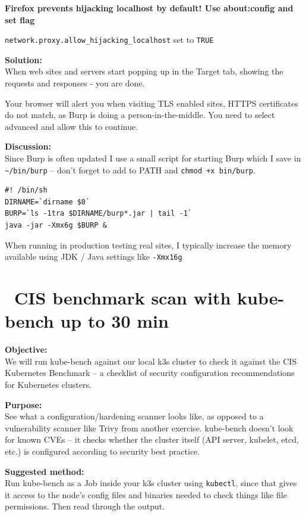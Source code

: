 \documentclass[a4paper,11pt,notitlepage]{report}
\begin{document}
\textbf{Firefox prevents hijacking localhost by default! Use about:config and set flag}

\verb+network.proxy.allow_hijacking_localhost+ set to \verb+TRUE+





{\bf Solution:}\\
When web sites and servers start popping up in the Target tab, showing the requests and responses - you are done.

Your browser will alert you when visiting TLS enabled sites, HTTPS certificates do not match, as Burp is doing a person-in-the-middle. You need to select advanced and allow this to continue.

{\bf Discussion:}\\
Since Burp is often updated I use a small script for starting Burp which I save in \verb+~/bin/burp+ -- don't forget to add to PATH and \verb;chmod +x bin/burp;.

\begin{verbatim}
#! /bin/sh
DIRNAME=`dirname $0`
BURP=`ls -1tra $DIRNAME/burp*.jar | tail -1`
java -jar -Xmx6g $BURP &
\end{verbatim}

When running in production testing real sites, I typically increase the memory available using JDK / Java settings like \verb+-Xmx16g+




\chapter{\faInfoCircle\ CIS benchmark scan with kube-bench up to 30 min}
\label{ex:sw-kubebench-k3s}
{\bf Objective:}\\
We will run kube-bench against our local k3s cluster to check it against the CIS Kubernetes Benchmark -- a checklist of security configuration recommendations for Kubernetes clusters.

{\bf Purpose:}\\
See what a configuration/hardening scanner looks like, as opposed to a vulnerability scanner like Trivy from another exercise. kube-bench doesn't look for known CVEs -- it checks whether the cluster itself (API server, kubelet, etcd, etc.) is configured according to security best practice.

{\bf Suggested method:}\\
Run kube-bench as a Job inside your k3s cluster using \verb+kubectl+, since that gives it access to the node's config files and binaries needed to check things like file permissions. Then read through the output.
\end{document}
